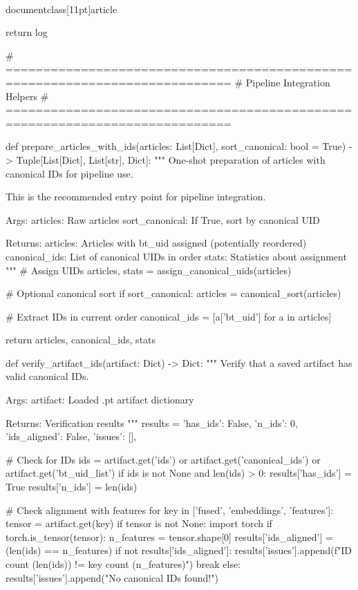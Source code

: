 \\documentclass[11pt]{article}
\begin{document}
\begin{CodeBlock}
    return log


# ============================================================================
# Pipeline Integration Helpers
# ============================================================================

def prepare_articles_with_ids(articles: List[Dict], sort_canonical: bool = True) -> Tuple[List[Dict], List[str], Dict]:
    """
    One-shot preparation of articles with canonical IDs for pipeline use.
    
    This is the recommended entry point for pipeline integration.
    
    Args:
        articles: Raw articles
        sort_canonical: If True, sort by canonical UID
        
    Returns:
        articles: Articles with bt_uid assigned (potentially reordered)
        canonical_ids: List of canonical UIDs in order
        stats: Statistics about assignment
    """
    # Assign UIDs
    articles, stats = assign_canonical_uids(articles)
    
    # Optional canonical sort
    if sort_canonical:
        articles = canonical_sort(articles)
    
    # Extract IDs in current order
    canonical_ids = [a['bt_uid'] for a in articles]
    
    return articles, canonical_ids, stats


def verify_artifact_ids(artifact: Dict) -> Dict:
    """
    Verify that a saved artifact has valid canonical IDs.
    
    Args:
        artifact: Loaded .pt artifact dictionary
        
    Returns:
        Verification results
    """
    results = {
        'has_ids': False,
        'n_ids': 0,
        'ids_aligned': False,
        'issues': [],
    }
    
    # Check for IDs
    ids = artifact.get('ids') or artifact.get('canonical_ids') or artifact.get('bt_uid_list')
    if ids is not None and len(ids) > 0:
        results['has_ids'] = True
        results['n_ids'] = len(ids)
        
        # Check alignment with features
        for key in ['fused', 'embeddings', 'features']:
            tensor = artifact.get(key)
            if tensor is not None:
                import torch
                if torch.is_tensor(tensor):
                    n_features = tensor.shape[0]
                    results['ids_aligned'] = (len(ids) == n_features)
                    if not results['ids_aligned']:
                        results['issues'].append(f"ID count ({len(ids)}) != {key} count ({n_features})")
                break
    else:
        results['issues'].append("No canonical IDs found!")
    

\end{CodeBlock}
\end{document}
